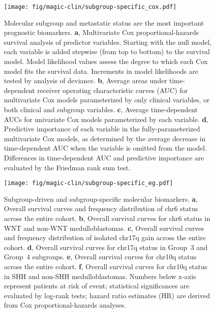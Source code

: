 \documentclass[11pt,letterpaper]{article}
\theoremstyle{definition}
\begin{document}
\begin{figure}[h]
	\begin{center}
		\texttt{[image: fig/magic-clin/subgroup-specific\_cox.pdf]}
	\end{center}
	\caption[Molecular subgroup and metastatic status are the most important prognostic biomarkers]
	{
	Molecular subgroup and metastatic status are the most important prognostic biomarkers.
	\textbf{a}, Multivariate Cox proportional-hazards survival analysis of predictor variables. Starting with the null model, each variable is added stepwise (from top to bottom) to the survival model. Model likelihood values assess the degree to which each Cox model fits the survival data. Increments in model likelihoods are tested by analysis of deviance. 
	\textbf{b}, Average areas under time-dependent receiver operating characteristic curves (AUC) for multivariate Cox models parameterized by only clinical variables, or both clinical and subgroup variables.
	\textbf{c}, Average time-dependent AUCs for univariate Cox models parameterized by each variable.
	\textbf{d}, Predictive importance of each variable in the fully-parameterized multivariate Cox models, as determined by the average decrease in time-dependent AUC when the variable is omitted from the model.
	Differences in time-dependent AUC and predictive importance are evaluated by the Friedman rank sum test.
	}
	\label{fig:subgroup-specific_cox}
\end{figure}

\begin{figure}[h]
	\begin{center}
		\texttt{[image: fig/magic-clin/subgroup-specific\_eg.pdf]}
	\end{center}
	\caption[Subgroup-driven and subgroup-specific molecular biomarkers]
	{
	Subgroup-driven and subgroup-specific molecular biomarkers.
	\textbf{a}, Overall survival curves and frequency distribution of chr6 status across the entire cohort.
	\textbf{b}, Overall survival curves for chr6 status in WNT and non-WNT medulloblastomas.		
	\textbf{c}, Overall survival curves and frequency distribution of isolated chr17q gain across the entire cohort.
	\textbf{d}, Overall survival curves for chr17q status in Group~3 and Group~4 subgroups. 
	\textbf{e}, Overall survival curves for chr10q status across the entire cohort.
	\textbf{f}, Overall survival curves for chr10q status in SHH and non-SHH medulloblastomas.
	Numbers below x-axis represent patients at risk of event; statistical significances are evaluated by log-rank tests; hazard ratio estimates (HR) are derived from Cox proportional-hazards analyses.
	}
	\label{fig:subgroup-specific_eg}
\end{figure}
\end{document}

